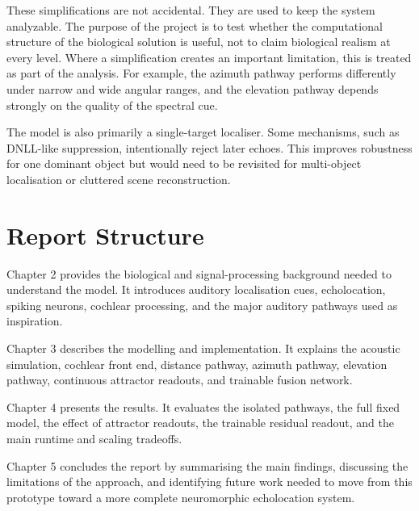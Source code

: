 These simplifications are not accidental. They are used to keep the system analyzable. The purpose of the project is to test whether the computational structure of the biological solution is useful, not to claim biological realism at every level. Where a simplification creates an important limitation, this is treated as part of the analysis. For example, the azimuth pathway performs differently under narrow and wide angular ranges, and the elevation pathway depends strongly on the quality of the spectral cue.

The model is also primarily a single-target localiser. Some mechanisms, such as DNLL-like suppression, intentionally reject later echoes. This improves robustness for one dominant object but would need to be revisited for multi-object localisation or cluttered scene reconstruction.

\section{Report Structure}

Chapter 2 provides the biological and signal-processing background needed to understand the model. It introduces auditory localisation cues, echolocation, spiking neurons, cochlear processing, and the major auditory pathways used as inspiration.

Chapter 3 describes the modelling and implementation. It explains the acoustic simulation, cochlear front end, distance pathway, azimuth pathway, elevation pathway, continuous attractor readouts, and trainable fusion network.

Chapter 4 presents the results. It evaluates the isolated pathways, the full fixed model, the effect of attractor readouts, the trainable residual readout, and the main runtime and scaling tradeoffs.

Chapter 5 concludes the report by summarising the main findings, discussing the limitations of the approach, and identifying future work needed to move from this prototype toward a more complete neuromorphic echolocation system.
